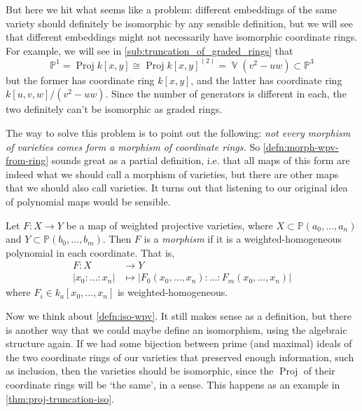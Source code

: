 \documentclass[10pt,notitlepage]{article}
\numberwithin{equation}{subsection}
\DeclareMathOperator{\proj}{Proj}
\DeclareMathOperator{\van}{\mathbb{V}}
\newcommand{\pee}{\mathbb{P}}
\newcommand{\kazn}{k_a[x_0,\ldots,x_n]}
\newcommand{\pazn}{\pee(a_0,\ldots,a_n)}
\begin{document}
    But here we hit what seems like a problem: different embeddings of the same variety should definitely be isomorphic by any sensible definition, but we will see that different embeddings might not necessarily have isomorphic coordinate rings.
    For example, we will see in \cref{sub:truncation_of_graded_rings} that
    \[
         \pee^1 = \proj k[x,y] \cong \proj k[x,y]^{(2)} = \van(v^2-uw)\subset\pee^3
    \]
    but the former has coordinate ring $k[x,y]$, and the latter has coordinate ring $k[u,v,w]/(v^2-uw)$.
    Since the number of generators is different in each, the two definitely can't be isomorphic as graded rings.

    The way to solve this problem is to point out the following: \emph{not every morphism of varieties comes form a morphism of coordinate rings.}
    So \cref{defn:morph-wpv-from-ring} sounds great as a partial definition, i.e. that all maps of this form are indeed what we should call a morphism of varieties, but there are other maps that we should also call varieties.
    It turns out that listening to our original idea of polynomial maps would be sensible.

    \begin{definition}
        Let $F\colon X\to Y$ be a map of weighted projective varieties, where $X\subset\pazn$ and $Y\subset\pee(b_0,\ldots,b_m)$.
        Then $F$ is a \emph{morphism} if it is a weighted-homogeneous polynomial in each coordinate.
        That is,
        \begin{align*}
            F\colon X&\to Y \\
            |x_0:\ldots:x_n| &\mapsto |F_0(x_0,\ldots,x_n):\ldots:F_m(x_0,\ldots,x_n)|
        \end{align*}
        where $F_i\in\kazn$ is weighted-homogeneous.
    \end{definition}

    Now we think about \cref{defn:iso-wpv}.
    It still makes sense as a definition, but there is another way that we could maybe define an isomorphism, using the algebraic structure again.
    If we had some bijection between prime (and maximal) ideals of the two coordinate rings of our varieties that preserved enough information, such as inclusion, then the varieties should be isomorphic, since the $\proj$ of their coordinate rings will be `the same', in a sense.
    This happens as an example in \cref{thm:proj-truncation-iso}.

    \bigskip
\end{document}
